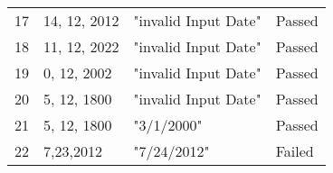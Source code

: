 \begin{table}[!htb]
\begin{tabular}{|l|l|l|l|}
        17                   & 14, 12, 2012 & "invalid Input Date"   &  Passed       \\ 
        18                   & 11, 12, 2022 & "invalid Input Date"   &  Passed       \\ 
        19                   & 0, 12, 2002  & "invalid Input Date"   &  Passed       \\ 
        20                   & 5, 12, 1800  & "invalid Input Date"   &  Passed       \\ 
        21                   & 5, 12, 1800  & "3/1/2000"             &  Passed       \\ 
        22                   & 7,23,2012    & "7/24/2012"            &  Failed       \\
        \hline
    \end{tabular}
\end{table}






